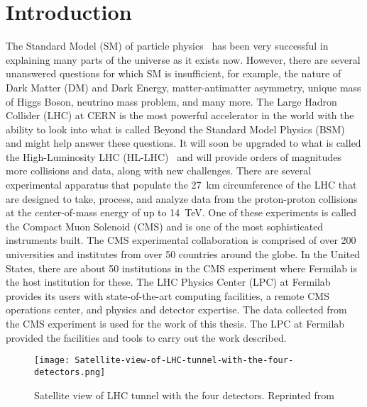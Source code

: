 \chapter{Introduction}

The Standard Model (SM) of particle physics~\cite{What_is_SM} has been very successful in explaining many parts of the universe as it exists now. However, there are several unanswered questions for which SM is insufficient, for example, the nature of Dark Matter (DM) and Dark Energy, matter-antimatter asymmetry, unique mass of Higgs Boson, neutrino mass problem, and many more.
The Large Hadron Collider (LHC) \cite{What_is_LHC} at CERN\cite{What_is_CERN} is the most powerful accelerator in the world with the ability to look into what is called Beyond the Standard Model Physics (BSM) and might help answer these questions. It will soon be upgraded to what is called the High-Luminosity LHC (HL-LHC)~\cite{hl-lhc} and will provide orders of magnitudes more collisions and data, along with new challenges.
There are several experimental apparatus that populate the 27~\unit{km} circumference of the LHC that are designed to take, process, and analyze data from the proton-proton collisions at the center-of-mass energy of up to 14~\unit{TeV}.
One of these experiments is called the Compact Muon Solenoid (CMS) \cite{CMS_detector} and is one of the most sophisticated instruments built. The CMS experimental collaboration is comprised of over 200 universities and institutes from over 50 countries around the globe. In the United States, there are about 50 institutions in the CMS experiment where Fermilab is the host institution for these. The LHC Physics Center (LPC) at Fermilab provides its users with state-of-the-art computing facilities, a remote CMS operations center, and physics and detector expertise.
The data collected from the CMS experiment is used for the work of this thesis. The LPC at Fermilab provided the facilities and tools to carry out the work described.

\begin{figure}
	\texttt{[image: Satellite-view-of-LHC-tunnel-with-the-four-detectors.png]}
	\caption[Satellite view of the LHC]{Satellite view of LHC tunnel with the four detectors. Reprinted from \cite{phdthesis}}
	\label{fig:Satellite}
\end{figure}

